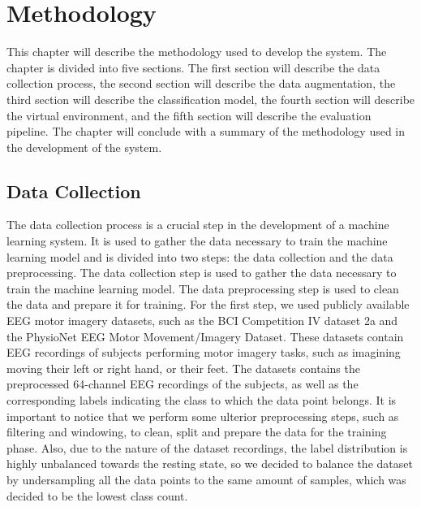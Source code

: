 \chapter{Methodology}\label{ch:methodology}
This chapter will describe the methodology used to develop the system.
The chapter is divided into five sections.
The first section will describe the data collection process, the second section will describe the data augmentation, the third section will describe the classification model, the fourth section will describe the virtual environment, and the fifth section will describe the evaluation pipeline.
The chapter will conclude with a summary of the methodology used in the development of the system.

\section{Data Collection}
The data collection process is a crucial step in the development of a machine learning system.
It is used to gather the data necessary to train the machine learning model and is divided into two steps: the data collection and the data preprocessing.
The data collection step is used to gather the data necessary to train the machine learning model.
The data preprocessing step is used to clean the data and prepare it for training.
For the first step, we used publicly available EEG motor imagery datasets, such as the BCI Competition IV dataset 2a and the PhysioNet EEG Motor Movement/Imagery Dataset.
These datasets contain EEG recordings of subjects performing motor imagery tasks, such as imagining moving their left or right hand, or their feet.
The datasets contains the preprocessed 64-channel EEG recordings of the subjects, as well as the corresponding labels indicating the class to which the data point belongs.
It is important to notice that we perform some ulterior preprocessing steps, such as filtering and windowing, to clean, split and prepare the data for the training phase.
Also, due to the nature of the dataset recordings, the label distribution is highly unbalanced towards the resting state, so we decided to balance the dataset by undersampling all the data points to the same amount of samples, which was decided to be the lowest class count.
